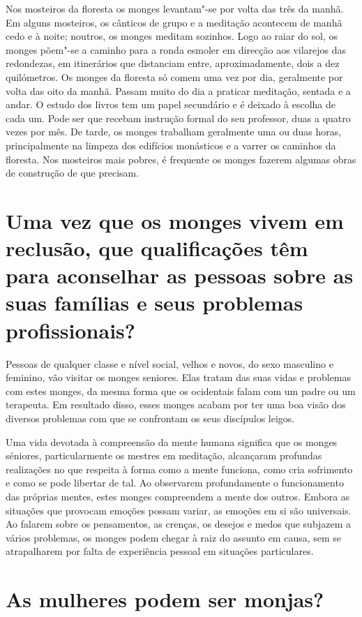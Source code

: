 Nos mosteiros da floresta os monges levantam"-se por volta das três da
manhã. Em alguns mosteiros, os cânticos de grupo e a meditação acontecem
de manhã cedo e à noite; noutros, os monges meditam sozinhos. Logo ao
raiar do sol, os monges põem"-se a caminho para a ronda esmoler em
direcção aos vilarejos das redondezas, em itinerários que distanciam
entre, aproximadamente, dois a dez quilómetros. Os monges da floresta só
comem uma vez por dia, geralmente por volta das oito da manhã. Passam
muito do dia a praticar meditação, sentada e a andar. O estudo dos
livros tem um papel secundário e é deixado à escolha de cada um. Pode
ser que recebam instrução formal do seu professor, duas a quatro vezes
por mês. De tarde, os monges trabalham geralmente uma ou duas horas,
principalmente na limpeza dos edifícios monásticos e a varrer os
caminhos da floresta. Nos mosteiros mais pobres, é frequente os monges
fazerem algumas obras de construção de que precisam.

\section{Uma vez que os monges vivem em reclusão, que qualificações têm para
  aconselhar as pessoas sobre as suas famílias e seus problemas profissionais?}

Pessoas de qualquer classe e nível social, velhos e novos, do sexo
masculino e feminino, vão visitar os monges seniores. Elas tratam das
suas vidas e problemas com estes monges, da mesma forma que os
ocidentais falam com um padre ou um terapeuta. Em resultado disso, esses
monges acabam por ter uma boa visão dos diversos problemas com que se
confrontam os seus discípulos leigos.

Uma vida devotada à compreensão da mente humana significa que os monges
séniores, particularmente os mestres em meditação, alcançaram profundas
realizações no que respeita à forma como a mente funciona, como cria
sofrimento e como se pode libertar de tal. Ao observarem profundamente o
funcionamento das próprias mentes, estes monges compreendem a mente dos
outros. Embora as situações que provocam emoções possam variar, as
emoções em si são universais. Ao falarem sobre os pensamentos, as
crenças, os desejos e medos que subjazem a vários problemas, os monges
podem chegar à raiz do assunto em causa, sem se atrapalharem por falta
de experiência pessoal em situações particulares.

\section{As mulheres podem ser monjas?}

